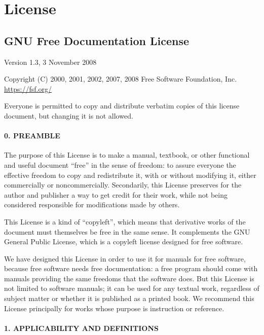 \hypertarget{license}{%
\section{License}\label{license}}

\hypertarget{gnu-free-documentation-license}{%
\subsection{GNU Free Documentation
License}\label{gnu-free-documentation-license}}

Version 1.3, 3 November 2008

Copyright (C) 2000, 2001, 2002, 2007, 2008 Free Software Foundation,
Inc. \url{https://fsf.org/}

Everyone is permitted to copy and distribute verbatim copies of this
license document, but changing it is not allowed.

\hypertarget{preamble}{%
\paragraph{0. PREAMBLE}\label{preamble}}

The purpose of this License is to make a manual, textbook, or other
functional and useful document ``free'' in the sense of freedom: to
assure everyone the effective freedom to copy and redistribute it, with
or without modifying it, either commercially or noncommercially.
Secondarily, this License preserves for the author and publisher a way
to get credit for their work, while not being considered responsible for
modifications made by others.

This License is a kind of ``copyleft'', which means that derivative
works of the document must themselves be free in the same sense. It
complements the GNU General Public License, which is a copyleft license
designed for free software.

We have designed this License in order to use it for manuals for free
software, because free software needs free documentation: a free program
should come with manuals providing the same freedoms that the software
does. But this License is not limited to software manuals; it can be
used for any textual work, regardless of subject matter or whether it is
published as a printed book. We recommend this License principally for
works whose purpose is instruction or reference.

\hypertarget{applicability-and-definitions}{%
\paragraph{1. APPLICABILITY AND
DEFINITIONS}\label{applicability-and-definitions}}


